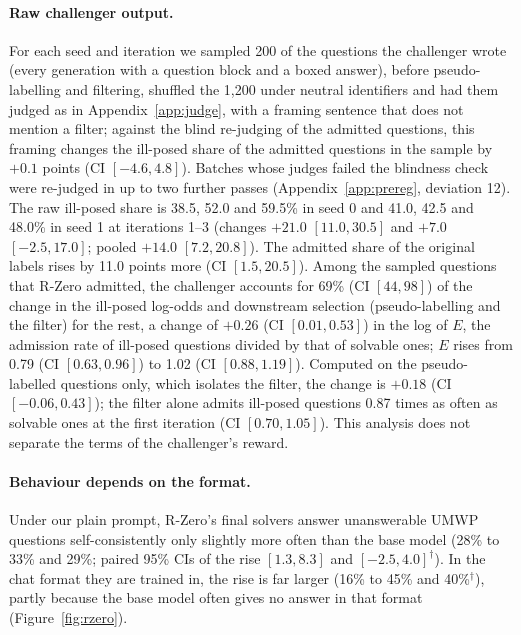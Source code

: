 \paragraph{Raw challenger output.} For each seed and iteration we sampled 200 of the questions the challenger wrote (every generation with a question block and a boxed answer), before pseudo-labelling and filtering, shuffled the 1,200 under neutral identifiers and had them judged as in Appendix~\ref{app:judge}, with a framing sentence that does not mention a filter; against the blind re-judging of the admitted questions, this framing changes the ill-posed share of the admitted questions in the sample by $+0.1$ points (CI $[-4.6, 4.8]$). Batches whose judges failed the blindness check were re-judged in up to two further passes (Appendix~\ref{app:prereg}, deviation 12). The raw ill-posed share is 38.5, 52.0 and 59.5\% in seed 0 and 41.0, 42.5 and 48.0\% in seed 1 at iterations 1--3 (changes $+21.0$ $[11.0, 30.5]$ and $+7.0$ $[-2.5, 17.0]$; pooled $+14.0$ $[7.2, 20.8]$). The admitted share of the original labels rises by 11.0 points more (CI $[1.5, 20.5]$). Among the sampled questions that R-Zero admitted, the challenger accounts for 69\% (CI $[44, 98]$) of the change in the ill-posed log-odds and downstream selection (pseudo-labelling and the filter) for the rest, a change of $+0.26$ (CI $[0.01, 0.53]$) in the log of $E$, the admission rate of ill-posed questions divided by that of solvable ones; $E$ rises from 0.79 (CI $[0.63, 0.96]$) to 1.02 (CI $[0.88, 1.19]$). Computed on the pseudo-labelled questions only, which isolates the filter, the change is $+0.18$ (CI $[-0.06, 0.43]$); the filter alone admits ill-posed questions 0.87 times as often as solvable ones at the first iteration (CI $[0.70, 1.05]$). This analysis does not separate the terms of the challenger's reward.

\paragraph{Behaviour depends on the format.} Under our plain prompt, R-Zero's final solvers answer unanswerable UMWP questions self-consistently only slightly more often than the base model (28\% to 33\% and 29\%; paired 95\% CIs of the rise $[1.3, 8.3]$ and $[-2.5, 4.0]^{\dagger}$). In the chat format they are trained in, the rise is far larger (16\% to 45\% and 40\%$^{\dagger}$), partly because the base model often gives no answer in that format (Figure~\ref{fig:rzero}).

